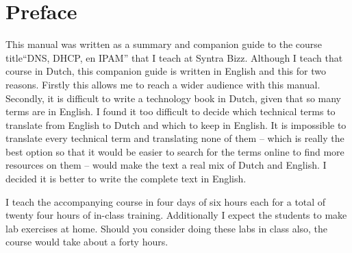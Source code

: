 \chapter{Preface}

This manual was written as a summary and companion guide to the course title``DNS, DHCP, en IPAM'' that I teach at Syntra Bizz.
Although I teach that course in Dutch, this companion guide is written in English and this for two reasons.
Firstly this allows me to reach a wider audience with this manual.
Secondly, it is difficult to write a technology book in Dutch, given that so many terms are in English.
I found it too difficult to decide which technical terms to translate from English to Dutch and which to keep in English.
It is impossible to translate every technical term and translating none of them -- which is really the best option so that it would be easier to search for the terms online to find more resources on them -- would make the text a real mix of Dutch and English.
I decided it is better to write the complete text in English.

I teach the accompanying course in four days of six hours each for a total of twenty four hours of in-class training.
Additionally I expect the students to make lab exercises at home.
Should you consider doing these labs in class also, the course would take about a forty hours.


